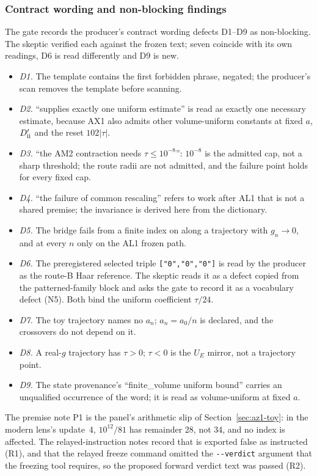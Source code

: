 \subsubsection{Contract wording and non-blocking findings}
\label{sec:az1-findings}
The gate records the producer's contract wording defects D1--D9 as
non-blocking. The skeptic verified each against the frozen text; seven
coincide with its own readings, D6 is read differently and D9 is new.
\begin{itemize}
\item \emph{D1.} The template contains the first forbidden phrase, negated;
 the producer's scan removes the template before scanning.
\item \emph{D2.} ``supplies exactly one uniform estimate'' is read as exactly
 one necessary estimate, because AX1 also admits other volume-uniform
 constants at fixed $a$, $D'_{\rm ii}$ and the reset $102|\tau|$.
\item \emph{D3.} ``the AM2 contraction needs $\tau\le10^{-8}$'': $10^{-8}$ is
 the admitted cap, not a sharp threshold; the route radii are not admitted,
 and the failure point holds for every fixed cap.
\item \emph{D4.} ``the failure of common rescaling'' refers to work after AL1
 that is not a shared premise; the invariance is derived here from the
 dictionary.
\item \emph{D5.} The bridge fails from a finite index on along a trajectory
 with $g_n\to0$, and at every $n$ only on the AL1 frozen path.
\item \emph{D6.} The preregistered selected triple \texttt{["0","0","0"]} is
 read by the producer as the route-B Haar reference. The skeptic reads it as
 a defect copied from the patterned-family block and asks the gate to record
 it as a vocabulary defect (N5). Both bind the uniform coefficient $\tau/24$.
\item \emph{D7.} The toy trajectory names no $a_n$; $a_n=a_0/n$ is declared,
 and the crossovers do not depend on it.
\item \emph{D8.} A real-$g$ trajectory has $\tau>0$; $\tau<0$ is the $U_E$
 mirror, not a trajectory point.
\item \emph{D9.} The state provenance's ``finite\_volume uniform bound''
 carries an unqualified occurrence of the word; it is read as volume-uniform
 at fixed $a$.
\end{itemize}
The premise note P1 is the panel's arithmetic slip of
Section~\ref{sec:az1-toy}: in the modern lens's update~4,
$10^{12}/81$ has remainder 28, not 34, and no index is affected. The
relayed-instruction notes record that  is
exported false as instructed (R1), and that the relayed freeze command
omitted the \texttt{-{}-verdict} argument that the freezing tool requires,
so the proposed forward verdict text was passed (R2).

